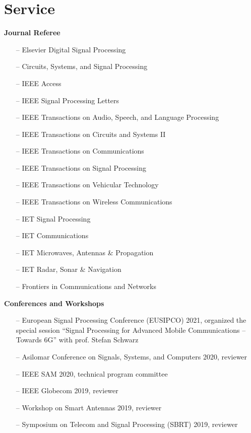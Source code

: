 \section{Service} 

{\bf Journal Referee}\\
\begin{itemize}
	\item[--] Elsevier Digital Signal Processing
	\item[--] Circuits, Systems, and Signal Processing
	\item[--] IEEE Access
	\item[--] IEEE Signal Processing Letters
	\item[--] IEEE Transactions on Audio, Speech, and Language Processing
	\item[--] IEEE Transactions on Circuits and Systems II
	\item[--] IEEE Transactions on Communications
	\item[--] IEEE Transactions on Signal Processing 
	\item[--] IEEE Transactions on Vehicular Technology
	\item[--] IEEE Transactions on Wireless Communications
	\item[--] IET Signal Processing
	\item[--] IET Communications
	\item[--] IET Microwaves, Antennas \& Propagation
	\item[--] IET Radar, Sonar \& Navigation
	\item[--] Frontiers in Communications and Networks 
\end{itemize}

{\bf Conferences and Workshops}\\
\begin{itemize}
	\item[--] European Signal Processing Conference (EUSIPCO) 2021, organized the special session ``Signal Processing for Advanced Mobile Communications – Towards 6G'' with prof. Stefan Schwarz
	\item[--] Asilomar Conference on Signals, Systems, and Computers 2020, reviewer
	\item[--] IEEE SAM 2020, technical program committee
	\item[--] IEEE Globecom 2019, reviewer
	\item[--] Workshop on Smart Antennas 2019, reviewer
	\item[--] Symposium on Telecom and Signal Processing (SBRT) 2019, reviewer
\end{itemize}